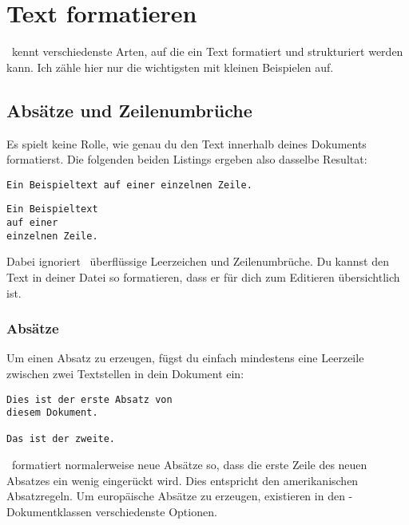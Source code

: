 %
%

\chapter{Text formatieren}

\DMLLaTeX \ kennt verschiedenste Arten, auf die ein Text formatiert und strukturiert werden kann. Ich zähle hier nur die wichtigsten mit kleinen Beispielen auf.

\section{Absätze und Zeilenumbrüche}

Es spielt keine Rolle, wie genau du den Text innerhalb deines Dokuments formatierst. Die folgenden beiden Listings ergeben also dasselbe Resultat:

\begin{lstlisting}
Ein Beispieltext auf einer einzelnen Zeile.
\end{lstlisting}

\begin{lstlisting}
Ein Beispieltext
auf einer
einzelnen Zeile.
\end{lstlisting}

Dabei ignoriert \DMLLaTeX \ überflüssige Leerzeichen und Zeilenumbrüche. Du kannst den Text in deiner Datei so formatieren, dass er für dich zum Editieren übersichtlich ist.

\subsection{Absätze}

Um einen Absatz zu erzeugen, fügst du einfach mindestens eine Leerzeile zwischen zwei Textstellen in dein Dokument ein:

\begin{lstlisting}
Dies ist der erste Absatz von
diesem Dokument.

Das ist der zweite.
\end{lstlisting}

\DMLLaTeX \ formatiert normalerweise neue Absätze so, dass die erste Zeile des neuen Absatzes ein wenig eingerückt wird. Dies entspricht den amerikanischen Absatzregeln. Um europäische Absätze zu erzeugen, existieren in den \KOMAScript-Dokumentklassen verschiedenste Optionen.

